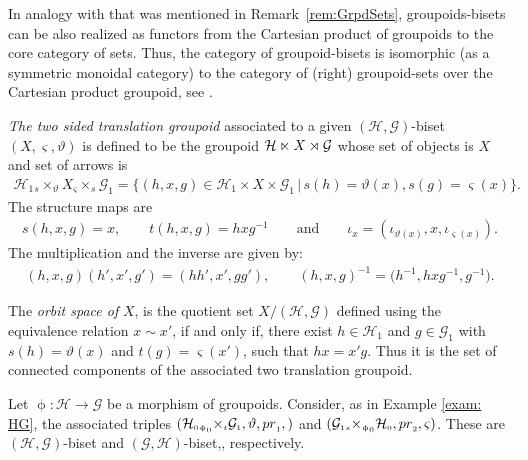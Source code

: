 \documentclass[11pt]{article}
\numberwithin{equation}{section}
\newcommand{\Ga}{\cG_{\Sscript{1}}}
\newcommand{\Ho}{\cH_{\Sscript{0}}}
\newcommand{\Ha}{\cH_{\Sscript{1}}}
\newcommand{\cG}{{\mathcal G}}
\newcommand{\cH}{{\mathcal H}}
\newcommand{\Sscript}[1]{\scriptscriptstyle{#1}}
\newcommand{\due}[3]{{}_{{#2 }} {#1}_{{ #3}} }
\begin{document}
In analogy with that was mentioned in Remark~\ref{rem:GrpdSets}, groupoids-bisets can be also realized as functors from the Cartesian product of groupoids to the core category of sets. Thus, the category of groupoid-bisets is isomorphic (as a symmetric monoidal category) to the category of (right) groupoid-sets over the Cartesian product groupoid, see \cite[Proposition~3.12]{Kaoutit/Spinosa:2018}.

\emph{The two sided translation groupoid} associated to a given $(\cH, \cG)$-biset $(X,\varsigma, \vartheta)$ is defined to be the groupoid $\cH \lJoin X \rJoin \cG$ whose set of objects is $X$ and set of arrows is
\begin{gather*}
\cH_{\Sscript{1}} \due \times {\Sscript{{s}}} {\Sscript{\vartheta}} X \due \times {\Sscript{\varsigma}}{\Sscript{{s}}} \cG_{\Sscript{1}} = \big\{ (h,x,g) \in\cH_{\Sscript{1}}\times X \times \cG_{\Sscript{1}}\,|\, {s}(h)= \vartheta(x), {s}(g)=\varsigma(x) \big\}.
\end{gather*}
The structure maps are
\begin{gather*}
{s}(h,x,g)=x,\qquad {t}(h,x,g)=hxg^{-1}\qquad \text{and}\qquad \iota_{\Sscript{x}}=(\iota_{\Sscript{\vartheta(x)}}, x,\iota_{\Sscript{\varsigma(x)}}).
\end{gather*}
The multiplication and the inverse are given by:
\begin{gather*}
(h,x,g) (h',x',g') = (hh',x',gg'),\qquad (h,x,g)^{-1}=\big(h^{-1}, hxg^{-1}, g^{-1}\big).
\end{gather*}

The \emph{orbit space of} $X$, is the quotient set $X / (\cH,\cG)$ defined using the equivalence relation $x \sim x'$, if and only if, there exist $h \in \Ha$ and $g \in \Ga$ with $s(h)=\vartheta(x)$ and $t(g)=\varsigma(x')$, such that $hx = x'g$. Thus it is the set of connected components of the associated two translation groupoid.

\begin{Example}\label{exam:bisets}Let $\upphi\colon \cH \to \cG$ be a morphism of groupoids. Consider, as in Example \ref{exam: HG}, the associated triples $(\Ho \due \times {\Sscript{\upphi_0}} { \Sscript{t}} \Ga, \vartheta, {\rm pr}_{\Sscript{1}},)$ and $(\Ga \due \times {\Sscript{s}} { \Sscript{\upphi_0}} \Ho, {\rm pr}_{\Sscript{2}}, \varsigma)$. These are $(\cH, \cG)$-biset and $(\cG,\cH)$-biset,, respectively.
\end{Example}
\end{document}
